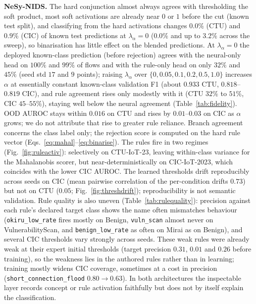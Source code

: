 \documentclass[journal]{IEEEtran}
\begin{document}
\textbf{NeSy-NIDS.} The hard conjunction almost always agrees with thresholding the soft product, most soft activations are already near $0$ or $1$ before the cut (known test split), and classifying from the hard activations changes $0.0\%$ (CTU) and $0.9\%$ (CIC) of known test predictions at $\lambda_\alpha{=}0$ ($0.0\%$ and up to $3.2\%$ across the sweep), so binarisation has little effect on the blended predictions. At $\lambda_\alpha{=}0$ the deployed known-class prediction (before rejection) agrees with the neural-only head on $100\%$ and $99\%$ of flows and with the rule-only head on only $32\%$ and $45\%$ (seed std $17$ and $9$ points); raising $\lambda_\alpha$ over $\{0,0.05,0.1,0.2,0.5,1.0\}$ increases $\alpha$ at essentially constant known-class validation F1 (about $0.933$ CTU, $0.818$--$0.819$ CIC), and rule agreement rises only modestly with it (CTU $32\%$ to $51\%$, CIC $45$--$55\%$), staying well below the neural agreement (Table~\ref{tab:fidelity}). OOD AUROC stays within $0.016$ on CTU and rises by $0.01$--$0.03$ on CIC as $\alpha$ grows; we do not attribute that rise to greater rule reliance. Branch agreement concerns the class label only; the rejection score is computed on the hard rule vector (Eqs.~\ref{eq:mahal}--\ref{eq:binarise}). The rules fire in two regimes (Fig.~\ref{fig:ruleactiv}): selectively on CTU-IoT-23, leaving within-class variance for the Mahalanobis scorer, but near-deterministically on CIC-IoT-2023, which coincides with the lower CIC AUROC. The learned thresholds drift reproducibly across seeds on CIC (mean pairwise correlation of the per-condition drifts $0.73$) but not on CTU ($0.05$; Fig.~\ref{fig:threshdrift}); reproducibility is not semantic validation. Rule quality is also uneven (Table~\ref{tab:rulequality}): precision against each rule's declared target class shows the name often mismatches behaviour (\texttt{okiru\_low\_rate} fires mostly on Benign, \texttt{vuln\_scan} almost never on VulnerabilityScan, and \texttt{benign\_low\_rate} as often on Mirai as on Benign), and several CIC thresholds vary strongly across seeds. These weak rules were already weak at their expert initial thresholds (target precision $0.31$, $0.01$ and $0.26$ before training), so the weakness lies in the authored rules rather than in learning; training mostly widens CIC coverage, sometimes at a cost in precision (\texttt{short\_connection\_flood} $0.80{\to}0.63$). In both architectures the inspectable layer records concept or rule activation faithfully but does not by itself explain the classification.
\end{document}
